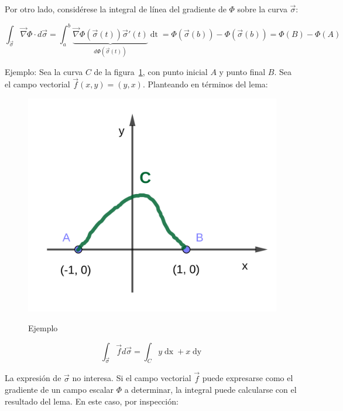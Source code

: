 \documentclass{article}
\begin{document}
Por otro lado, considérese la integral de línea del gradiente de $\Phi$ sobre la curva $\overrightarrow{\sigma}$:

\begin{equation}
\int_{\overrightarrow{\sigma}} \overrightarrow{\nabla}\Phi \cdot d\overrightarrow{\sigma} = \int_a^b \underbrace{ \overrightarrow{\nabla}\Phi( \overrightarrow{\sigma}(t) ) \overrightarrow{\sigma}'(t) }_{d\Phi(\overrightarrow{\sigma}(t))} \mathop{dt} = \Phi(\overrightarrow{\sigma}(b)) - \Phi(\overrightarrow{\sigma}(b)) = \Phi(B) - \Phi(A)
\end{equation}

Ejemplo: Sea la curva $C$ de la figura~\ref{fig:ccej}, con punto inicial $A$ y punto final $B$. Sea el campo vectorial $\overrightarrow{f}(x,y) = (y, x)$. Planteando en términos del lema:

\begin{figure}[ht]
\centering
\caption{Ejemplo}
\includegraphics[scale=1]{img/integrales/cc_ej.png}
\label{fig:ccej}
\end{figure}

\begin{equation}
\int_{\overrightarrow{\sigma}} \overrightarrow{f} d\overrightarrow{\sigma} = \int_C y \mathop{dx} + x \mathop{dy}
\end{equation}

La expresión de $\overrightarrow{\sigma}$ no interesa. Si el campo vectorial $\overrightarrow{f}$ puede expresarse como el gradiente de un campo escalar $\Phi$ a determinar, la integral puede calcularse con el resultado del lema. En este caso, por inspección:
\end{document}
